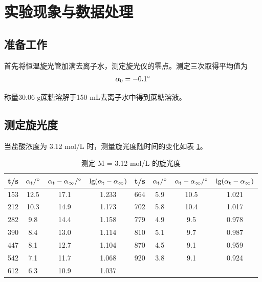 \documentclass[cn,hazy,pku,12pt,normal,math=newtx,cite=super]{elegantnote}
\begin{document}
\section{实验现象与数据处理}

\subsection{准备工作}

首先将恒温旋光管加满去离子水，测定旋光仪的零点。测定三次取得平均值为
$$ \alpha_0 = -0.1\degree $$

称量30.06 g蔗糖溶解于150 mL去离子水中得到蔗糖溶液。

\subsection{测定旋光度}
当盐酸浓度为 3.12 mol/L 时，测量旋光度随时间的变化如表 \ref{5}。

\begin{table}[h]
    \centering
    \caption{测定 M = 3.12 mol/L 的旋光度}
    \label{5}
    \begin{tabular}{cccc|cccc}
    \hline
    t/s & \multicolumn{1}{l}{$\rm \alpha_t / \degree$} & $\rm \alpha_t - \alpha_\infty / \degree$ & \multicolumn{1}{l|}{$\rm lg(\alpha_t-\alpha_\infty)$} & t/s & \multicolumn{1}{l}{$\rm \alpha_t / \degree$} & $\rm \alpha_t - \alpha_\infty / \degree$ & \multicolumn{1}{l}{$\rm lg(\alpha_t-\alpha_\infty)$} \\ \hline
    153 & 12.5 & 17.1 & 1.233 & 664 & 5.9 & 10.5 & 1.021 \\
    212 & 10.3 & 14.9 & 1.173 & 702 & 5.8 & 10.4 & 1.017 \\
    282 & 9.8  & 14.4 & 1.158 & 779 & 4.9 & 9.5  & 0.978 \\
    390 & 8.4  & 13.0 & 1.114 & 810 & 5.1 & 9.7  & 0.987 \\
    447 & 8.1  & 12.7 & 1.104 & 870 & 4.5 & 9.1  & 0.959 \\
    542 & 7.1  & 11.7 & 1.068 & 920 & 3.8 & 9.1  & 0.924 \\
    612 & 6.3  & 10.9 & 1.037 &     &     & &       \\ \hline
    \end{tabular}
\end{table}
\end{document}
